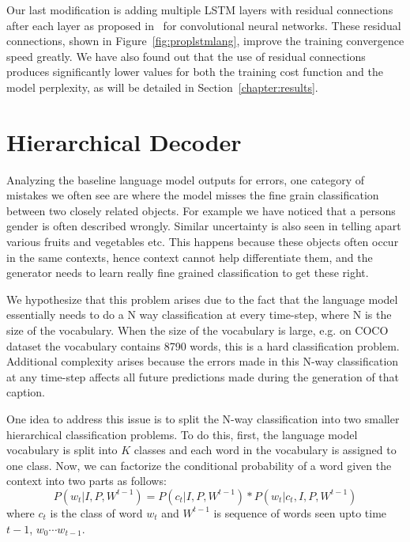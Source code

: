 Our last modification is adding multiple LSTM layers with residual connections
after each layer as proposed in~\cite{He2015} for convolutional neural networks.
These residual connections, shown in Figure~\ref{fig:proplstmlang}, improve the
training convergence speed greatly.
We have also found out that the use of residual connections produces
significantly lower values for both the training cost function and the model
perplexity, as will be detailed in Section~\ref{chapter:results}.

\section{Hierarchical Decoder}
\label{sec:ClassFact}
Analyzing the baseline language model outputs for errors, one category of
mistakes we often see are where the model misses the fine grain
classification between two closely related objects.
For example we have noticed that a persons gender is often described wrongly.
Similar uncertainty is also seen in telling apart various fruits and vegetables etc.
This happens because these objects often occur in the same contexts, hence
context cannot help differentiate them, and the generator needs to learn really
fine grained classification to get these right.

We hypothesize that this problem arises due to the fact that the language model
essentially needs to do a N way classification at every time-step, where N is
the size of the vocabulary.
When the size of the vocabulary is large, e.g. on COCO dataset the vocabulary
contains 8790 words, this is a hard classification problem.
Additional complexity arises because the errors made in this N-way
classification at any time-step affects all future predictions made during the
generation of that caption.

One idea to address this issue is to split the N-way classification into two
smaller hierarchical classification problems.
To do this, first, the language model vocabulary is split into $K$ classes and
each word in the vocabulary is assigned to one class. 
Now, we can factorize the conditional probability of a word given the context
into two parts as follows:
\begin{equation}
  \label{eq:class} 
  P(w_t | I,P, W^{t-1}) = P(c_t| I,P, W^{t-1})*P(w_t | c_t, I,P,W^{t-1})
\end{equation}
\noindent where $c_t$ is the class of word $w_t$ and $W^{t-1}$ is sequence of words
seen upto time $t-1$, $w_0\cdots w_{t-1}$.

